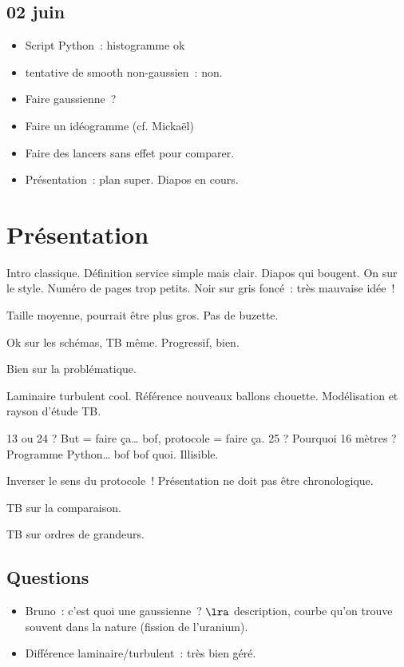 \documentclass[a4paper, 11pt, final, garamond]{book}
\begin{document}
\subsection{02 juin}
\begin{itemize}
  \item Script Python~: histogramme ok
  \item tentative de smooth non-gaussien~: non.
  \item Faire gaussienne~?
  \item Faire un idéogramme (cf. Mickaël)
  \item Faire des lancers sans effet pour comparer.
  \item Présentation~: plan super. Diapos en cours.
\end{itemize}

\section{Présentation}

Intro classique. Définition service simple mais clair. Diapos qui bougent. On
sur le style. Numéro de pages trop petits. Noir sur gris foncé~: très mauvaise
idée~!

Taille moyenne, pourrait être plus gros. Pas de buzette.

Ok sur les schémas, TB même. Progressif, bien.

Bien sur la problématique.

Laminaire turbulent cool. Référence nouveaux ballons chouette. Modélisation et
rayson d'étude TB.

13 ou 24 ? But = faire ça… bof, protocole = faire ça.
25 ? Pourquoi 16 mètres ?
Programme Python… bof bof quoi. Illisible.

Inverser le sens du protocole~! Présentation ne doit pas être chronologique.

TB sur la comparaison.

TB sur ordres de grandeurs.

\subsection{Questions}
\begin{itemize}
  \item Bruno~: c'est quoi une gaussienne~?
    $\lra$ description, courbe qu'on trouve souvent dans la nature (fission de
    l'uranium).
  \item Différence laminaire/turbulent~: très bien géré.
\end{itemize}
\end{document}
